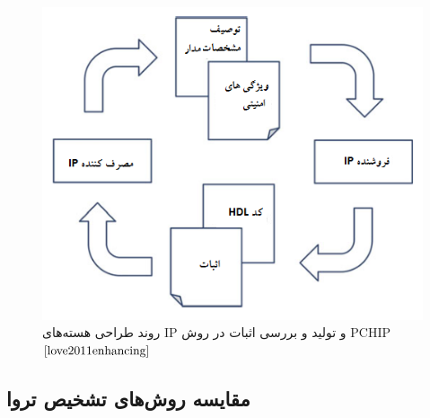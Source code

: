 \begin{figure}
	\begin{center}
		\includegraphics[scale=.8]{figs/fig8-5.png}
		\caption[روند طراحی هسته‌های IP و تولید و بررسی اثبات در روش PCHIP]
		{روند طراحی هسته‌های IP و تولید و بررسی اثبات در روش PCHIP $\cite{love2011enhancing}$}
		\label{fig8-5}
	\end{center}
\end{figure} 

\subsection{مقایسه روش‌های تشخیص تروا} 
